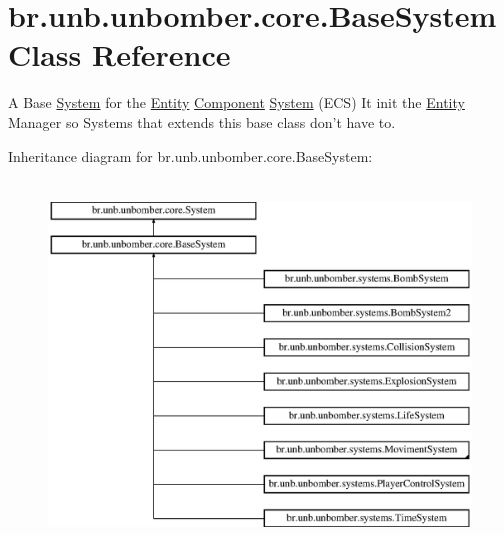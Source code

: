 \hypertarget{classbr_1_1unb_1_1unbomber_1_1core_1_1_base_system}{\section{br.\+unb.\+unbomber.\+core.\+Base\+System Class Reference}
\label{classbr_1_1unb_1_1unbomber_1_1core_1_1_base_system}
}


A Base \hyperlink{interfacebr_1_1unb_1_1unbomber_1_1core_1_1_system}{System} for the \hyperlink{classbr_1_1unb_1_1unbomber_1_1core_1_1_entity}{Entity} \hyperlink{classbr_1_1unb_1_1unbomber_1_1core_1_1_component}{Component} \hyperlink{interfacebr_1_1unb_1_1unbomber_1_1core_1_1_system}{System} (E\+C\+S) It init the \hyperlink{classbr_1_1unb_1_1unbomber_1_1core_1_1_entity}{Entity} Manager so Systems that extends this base class don't have to.  


Inheritance diagram for br.\+unb.\+unbomber.\+core.\+Base\+System\+:\begin{figure}[H]
\begin{center}
\leavevmode
\includegraphics[height=9.756097cm]{classbr_1_1unb_1_1unbomber_1_1core_1_1_base_system}
\end{center}
\end{figure}
